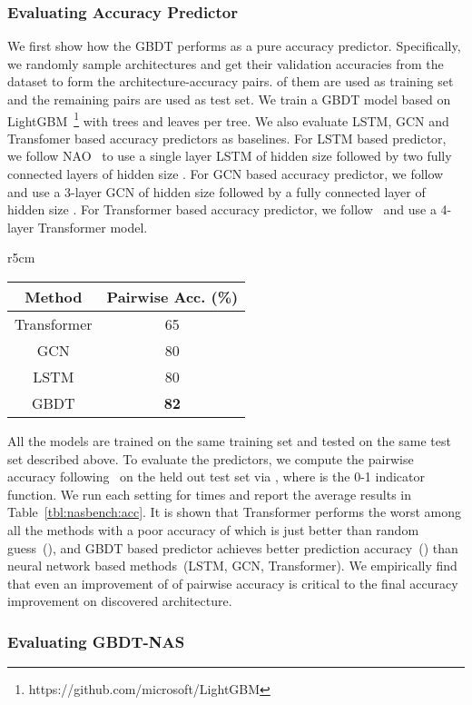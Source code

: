 \documentclass{article}
\begin{document}
\subsubsection{Evaluating Accuracy Predictor}
We first show how the GBDT performs as a pure accuracy predictor. Specifically, we randomly sample  architectures and get their validation accuracies from the dataset to form the architecture-accuracy pairs.  of them are used as training set and the remaining  pairs are used as test set. We train a GBDT model based on LightGBM~\cite{lightgbm}\footnote{https://github.com/microsoft/LightGBM} with  trees and  leaves per tree. We also evaluate LSTM, GCN and Transfomer based accuracy predictors as baselines. For LSTM based predictor, we follow NAO~\cite{nao} to use a single layer LSTM of hidden size  followed by two fully connected layers of hidden size . For GCN based accuracy predictor, we follow~\cite{neuralpredictor} and use a 3-layer GCN of hidden size  followed by a fully connected layer of hidden size . For Transformer based accuracy predictor, we follow~\cite{transformer} and use a 4-layer Transformer model.
\begin{wraptable}{r}{5cm}
\small
\caption{Pairwise accuracy of different predictors.}
\centering
\begin{tabular}{cc}
\toprule
Method  & Pairwise Acc. (\%)\\
\midrule
Transformer  & 65\\
GCN & 80\\
LSTM & 80\\
GBDT & \textbf{82}\\
\bottomrule
\end{tabular}
\label{tbl:nasbench:acc}
\end{wraptable}
All the models are trained on the same training set and tested on the same test set described above. To evaluate the predictors, we compute the pairwise accuracy following~\cite{nao} on the held out test set via , where  is the 0-1 indicator function. We run each setting for  times and report the average results in Table~\ref{tbl:nasbench:acc}. It is shown that Transformer performs the worst among all the methods with a poor accuracy of  which is just better than random guess~(), and GBDT based predictor achieves better prediction accuracy~() than neural network based methods~(LSTM, GCN, Transformer). We empirically find that even an improvement of  of pairwise accuracy is critical to the final accuracy improvement on discovered architecture.

\subsubsection{Evaluating GBDT-NAS}
\end{document}
